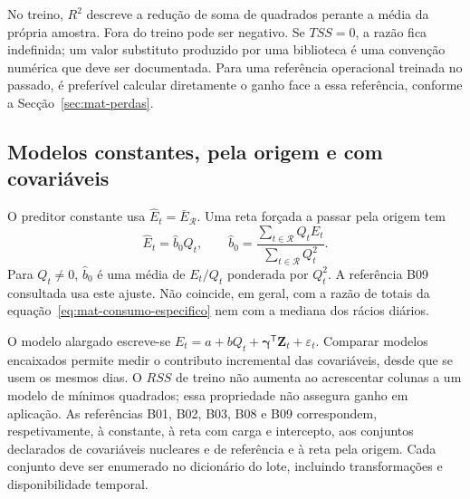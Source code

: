 No treino, $R^2$ descreve a redução de soma de quadrados perante a média da própria amostra. Fora do treino pode ser negativo. Se $TSS=0$, a razão fica indefinida; um valor substituto produzido por uma biblioteca é uma convenção numérica que deve ser documentada. Para uma referência operacional treinada no passado, é preferível calcular diretamente o ganho face a essa referência, conforme a Secção~\ref{sec:mat-perdas}.


\subsection{Modelos constantes, pela origem e com covariáveis}
\label{sec:mat-modelos-comparadores}
O preditor constante usa $\widehat E_t=\bar E_{\mathcal R}$. Uma reta forçada a passar pela origem tem
\begin{equation}
\widehat E_t=\widehat b_0Q_t,
\qquad \widehat b_0=\frac{\sum_{t\in\mathcal R}Q_tE_t}{\sum_{t\in\mathcal R}Q_t^2}.
\label{eq:mat-origem}
\end{equation}
Para $Q_t\neq0$, $\widehat b_0$ é uma média de $E_t/Q_t$ ponderada por $Q_t^2$. A referência B09 consultada usa este ajuste. Não coincide, em geral, com a razão de totais da equação~\ref{eq:mat-consumo-especifico} nem com a mediana dos rácios diários.

O modelo alargado escreve-se $E_t=a+bQ_t+\boldsymbol\gamma^{\mathsf T}\boldsymbol Z_t+\varepsilon_t$. Comparar modelos encaixados permite medir o contributo incremental das covariáveis, desde que se usem os mesmos dias. O $RSS$ de treino não aumenta ao acrescentar colunas a um modelo de mínimos quadrados; essa propriedade não assegura ganho em aplicação. As referências B01, B02, B03, B08 e B09 correspondem, respetivamente, à constante, à reta com carga e intercepto, aos conjuntos declarados de covariáveis nucleares e de referência e à reta pela origem. Cada conjunto deve ser enumerado no dicionário do lote, incluindo transformações e disponibilidade temporal.

